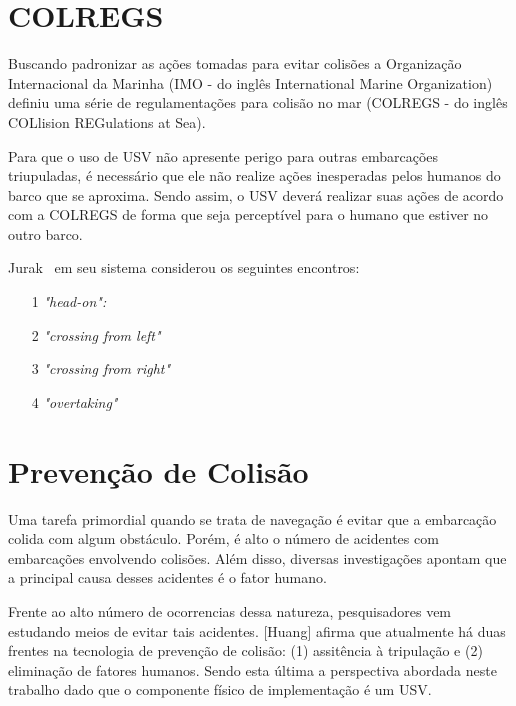     \section{COLREGS}\label{subchap2:colregs}
        Buscando padronizar as ações tomadas para evitar colisões a Organização Internacional da Marinha (IMO - do inglês International Marine Organization) definiu uma série de regulamentações para colisão no mar (COLREGS - do inglês COLlision REGulations at Sea).~\cite{JURAK2020}
        
        Para que o uso de USV não apresente perigo para outras embarcações triupuladas, é necessário que ele não realize ações inesperadas pelos humanos do barco que se aproxima. Sendo assim, o USV deverá realizar suas ações de acordo com a COLREGS de forma que seja perceptível para o humano que estiver no outro barco.~\cite{KUWATA2014110}
        
        Jurak~\cite{JURAK2020} em seu sistema considerou os seguintes encontros: 
        
        \begin{enumerate}
            \item [1] \textit{"head-on":}
            \item [2] \textit{"crossing from left"}
            \item [3] \textit{"crossing from right"}
            \item [4] \textit{"overtaking"}
        \end{enumerate}
        
        
        
    
    \section{Prevenção de Colisão}\label{subchap2:prev_col}
        Uma tarefa primordial quando se trata de navegação é evitar que a embarcação colida com algum obstáculo. Porém, é alto o número de acidentes com embarcações envolvendo colisões. Além disso, diversas investigações apontam que a principal causa desses acidentes é o fator humano.~\cite{HUANG2020451}
        
        Frente ao alto número de ocorrencias dessa natureza, pesquisadores vem estudando meios de evitar tais acidentes. [Huang] afirma que atualmente há duas frentes na tecnologia de prevenção de colisão: (1) assitência à tripulação e (2) eliminação de fatores humanos. Sendo esta última a perspectiva abordada neste trabalho dado que o componente físico de implementação é um USV.~\cite{HUANG2020451}
        
